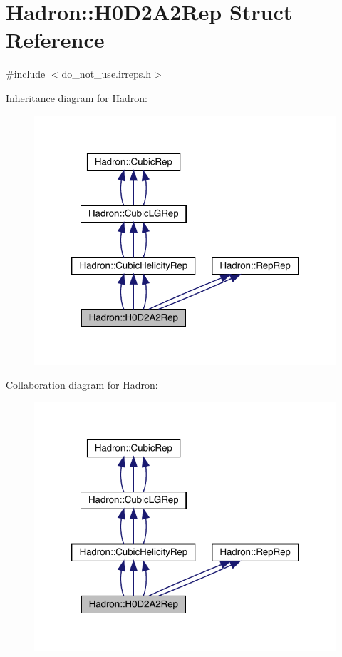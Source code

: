\hypertarget{structHadron_1_1H0D2A2Rep}{}\section{Hadron\+:\+:H0\+D2\+A2\+Rep Struct Reference}
\label{structHadron_1_1H0D2A2Rep}


{\ttfamily \#include $<$do\+\_\+not\+\_\+use.\+irreps.\+h$>$}



Inheritance diagram for Hadron\+:
\nopagebreak
\begin{figure}[H]
\begin{center}
\leavevmode
\includegraphics[width=320pt]{dc/dcc/structHadron_1_1H0D2A2Rep__inherit__graph}
\end{center}
\end{figure}


Collaboration diagram for Hadron\+:
\nopagebreak
\begin{figure}[H]
\begin{center}
\leavevmode
\includegraphics[width=320pt]{d8/ddc/structHadron_1_1H0D2A2Rep__coll__graph}
\end{center}
\end{figure}
